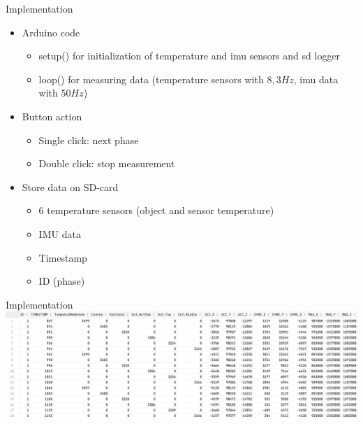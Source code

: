 \documentclass[en]{sdqbeamer}
\begin{document}
\begin{frame}{Implementation}
    \begin{itemize}
        \item Arduino code
        \begin{itemize}
            \item setup() for initialization of temperature and imu sensors and sd logger
            \item loop() for measuring data (temperature sensors with $8,3Hz$, imu data with $50Hz$)
        \end{itemize}
        \item Button action
        \begin{itemize}
            \item Single click: next phase
            \item Double click: stop measurement
        \end{itemize}
        \item Store data on SD-card
        \begin{itemize}
            \item 6 temperature sensors (object and sensor temperature)
            \item IMU data
            \item Timestamp
            \item ID (phase)
        \end{itemize}
    \end{itemize}
\end{frame}

\begin{frame}{Implementation}
    \includegraphics[width=\linewidth]{../thesis-doc/images/prototype/MeasurementRawDataSnippet_short.png} %
\end{frame}

\backupend
\end{document}
